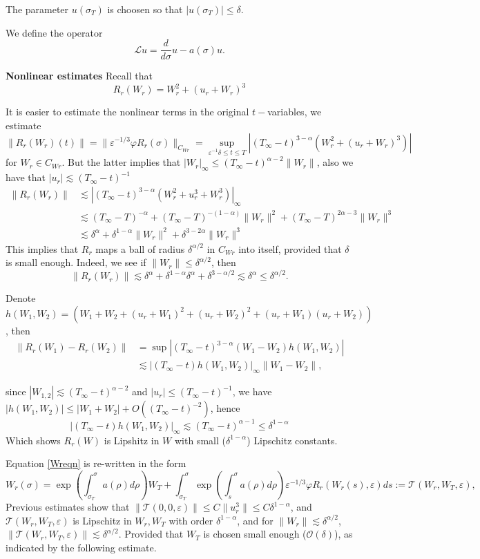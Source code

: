 \documentclass[letterpaper,11pt]{article}
\newcommand{\rmO}{\mathcal{O}}
\newcommand{\eps}{\varepsilon}
\newcommand{\lar}{ \lesssim }
\numberwithin{equation}{section}
\theoremstyle{plain}
\begin{document}
The parameter $u(\sigma_T)$ is choosen so that $|u(\sigma_T)|\le \delta$.

We define the operator
\[
\mathcal{L} u = \frac{d}{d\sigma}u-a(\sigma)u.
\]

\textbf{Nonlinear estimates}
Recall that 
\[
R_r(W_r) = W_r^2 + (u_r+W_r)^3
\]


It is easier to estimate the nonlinear terms in the original $t-$variables, we estimate
\[
\|R_r(W_r)(t)\|=\|\eps^{-1/3}\varphi R_r(\sigma)\|_{C_{Wr}}= \sup_{\eps^{-1}\delta \le t \le T}|(T_\infty -t)^{3-\alpha}(W_r^2+(u_r+W_r)^3) |
\]
for $W_r \in C_{Wr}$. But the latter implies that $|W_r|_\infty \le (T_\infty-t)^{\alpha-2}\|W_r\|$, also we have that $|u_r| \lar (T_\infty- t)^{-1}$
\begin{align*}
\|R_r(W_r)\|  &\lar  \left| (T_\infty-t)^{3-\alpha}(W_r^2+u_r^3+W_r^3)\right|_\infty \\
&\lar (T_\infty-T)^{-\alpha}+(T_\infty-T)^{-(1-\alpha)}\|W_r\|^2 +(T_\infty-T)^{2\alpha-3}\|W_r\|^3\\
& \lar \delta^\alpha+\delta^{1-\alpha}\|W_r\|^2 + \delta^{3-2\alpha}\|W_r\|^3
\end{align*}
This implies that $R_r$ maps a ball of radius $\delta^{\alpha/2}$ in $C_{Wr}$ into itself, provided that $\delta$ is small enough. Indeed, we see if $\|W_r\| \le \delta^{\alpha/2}$, then
\[
\|R_r(W_r)\| \lar \delta^{\alpha} + \delta^{1-\alpha}\delta^{\alpha} + \delta^{3-\alpha/2} \lar \delta^{\alpha} \le \delta^{\alpha/2}.
\]

Denote $h(W_1,W_2) = (W_1+W_2+(u_r+W_1)^2+(u_r+W_2)^2+(u_r+W_1)(u_r+W_2))$, then
\begin{align*}
\|R_r(W_1)-R_r(W_2)\| &= \sup|(T_\infty - t)^{3-\alpha} (W_1-W_2)h(W_1,W_2)|\\
& \lar |(T_\infty-t)h(W_1,W_2)|_\infty\|W_1-W_2\| ,
\end{align*}

since $|W_{1,2}| \lar (T_\infty-t)^{\alpha-2}$ and $|u_r| \le (T_\infty-t)^{-1}$, we have $|h(W_1,W_2)| \le |W_1+W_2|+O((T_\infty-t)^{-2})$, hence 
\[
|(T_\infty-t)h(W_1,W_2)|_\infty \lar (T_\infty-t)^{\alpha-1} \le \delta^{1-\alpha}
\]
Which shows $R_r(W)$ is Lipshitz in $W$ with small ($\delta^{1-\alpha}$) Lipschitz constants.

Equation \eqref{Wreqn} is re-written in the form 
\[
W_r(\sigma) = \exp\left(\int_{\sigma_T}^\sigma a(\rho)d\rho\right)W_T+\int_{\sigma_T}^\sigma \exp\left(\int_s^\sigma a(\rho)d\rho\right)\eps^{-1/3}\varphi R_r(W_r(s),\eps)ds := \mathcal{T}(W_r, W_T,\eps),
\]
Previous estimates show that
$\|\mathcal{T}(0,0,\eps) \| \le C\|u_r^3\| \le C\delta^{1-\alpha}$, and $\mathcal{T}(W_r,W_T,\eps) $ is Lipschitz in $W_r, W_T$ with order $\delta^{1-\alpha}$, and for $\|W_r\| \lar \delta^{\alpha/2}$, $\|\mathcal{T}(W_r,W_T,\eps)\| \lar \delta^{\alpha/2}$. Provided that $W_T$ is chosen small enough ($\rmO(\delta)$), as indicated by the following estimate.
\end{document}
